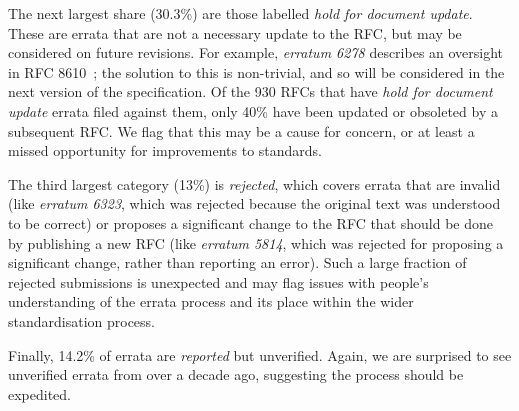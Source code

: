 \documentclass[twocolumn,10pt]{article}
\begin{document}
The next largest share (30.3\%) are those labelled \emph{hold for document
update}.  These are errata that are not a necessary update to the RFC, but
may be considered on future revisions. For example, \emph{erratum 6278}
describes an oversight in RFC 8610~\cite{RFC8610}; the solution to this is
non-trivial, and so will be considered in the next version of the
specification. Of the 930 RFCs that have \emph{hold for document update}
errata filed against them, only 40\% have been updated or obsoleted by a
subsequent RFC.  We flag that this may be a cause for concern, or at least
a missed opportunity for improvements to standards.

The third largest category (13\%) is \emph{rejected}, which covers errata
that are invalid (like \emph{erratum 6323}, which was rejected because the
original text was understood to be correct) or proposes a significant
change to the RFC that should be done by publishing a new RFC (like
\emph{erratum 5814}, which was rejected for proposing a significant change,
rather than reporting an error). Such a large fraction of rejected
submissions is unexpected and may flag issues with people's understanding
of the errata process and its place within the wider standardisation
process.

Finally, 14.2\% of errata are \emph{reported} but unverified.  Again, we
are surprised to see unverified errata from over a decade ago, suggesting
the process should be expedited. 
\end{document}
